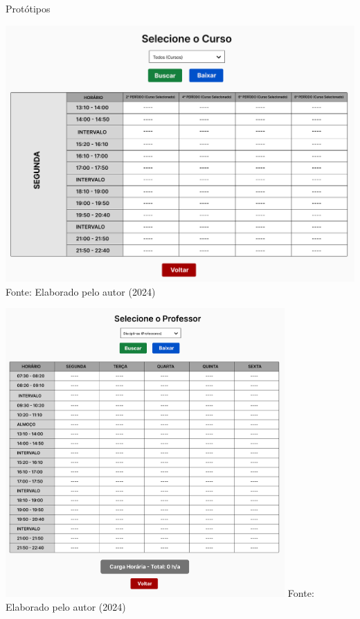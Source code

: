 \begin{frame}{Protótipos}
  \begin{minipage}{0.48\textwidth}
    \centering
    \includegraphics[width=1\textwidth]{figuras/proto-3.png}
    \small Fonte: Elaborado pelo autor (2024)
  \end{minipage}
  \hfill
  \begin{minipage}{0.48\textwidth}
    \centering
    \includegraphics[width=0.8\textwidth]{figuras/proto-4.png}
    \small Fonte: Elaborado pelo autor (2024)
  \end{minipage}
\end{frame}

